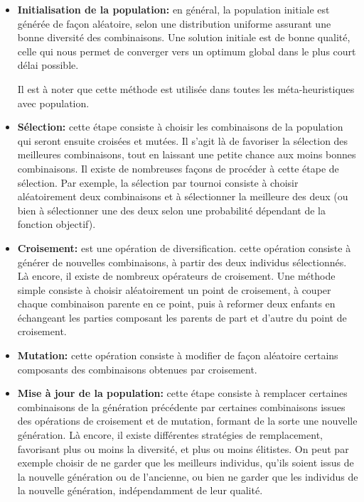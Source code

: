 \begin{enumerate}[label=\alph*)]
\begin{algorithm}[H]
\end{algorithm}

	
\begin{itemize}
	\item \textbf{Initialisation de la population: }en général, la population initiale est générée de façon aléatoire, selon une distribution uniforme assurant une bonne diversité des combinaisons. Une solution initiale est de bonne qualité, celle qui nous permet de converger vers un optimum global dans le plus court délai possible.
	
Il est à noter que cette méthode est utilisée dans toutes les méta-heuristiques avec population.

	\item \textbf{Sélection: } cette étape consiste à choisir les combinaisons de la population qui seront ensuite croisées et mutées. Il s’agit là de favoriser la sélection des meilleures combinaisons, tout en laissant une petite chance aux moins bonnes combinaisons. Il existe de nombreuses façons de procéder à cette étape de sélection. Par exemple, la sélection par tournoi consiste à choisir aléatoirement deux combinaisons et à sélectionner la meilleure des deux (ou bien à sélectionner une des deux selon une probabilité dépendant de la fonction objectif).
	
	\item \textbf{Croisement:} est une opération de diversification. cette opération consiste à générer de nouvelles combinaisons, à partir des deux individus sélectionnés. Là encore, il existe de nombreux opérateurs de croisement. Une méthode simple consiste à choisir aléatoirement un point de croisement, à couper chaque combinaison parente en ce point, puis à reformer deux enfants en échangeant les parties composant les parents de part et d’autre du point de croisement.
	
	\item \textbf{Mutation: } cette opération consiste à modifier de façon aléatoire certains composants des combinaisons obtenues par croisement.
	
	\item \textbf{Mise à jour de la population: } cette étape consiste à remplacer certaines combinaisons de la génération précédente par certaines combinaisons issues des opérations de croisement et de mutation, formant de la sorte une nouvelle génération. Là encore, il existe différentes stratégies de remplacement, favorisant plus ou moins la diversité, et plus ou moins élitistes. On peut par exemple choisir de ne garder que les meilleurs individus, qu’ils soient issus de la nouvelle génération ou de l’ancienne, ou bien ne garder que les individus de la nouvelle génération, indépendamment de leur qualité.
	

\end{itemize}
\end{enumerate}
